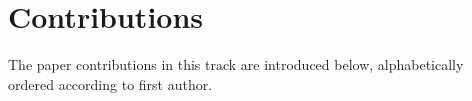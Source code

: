 

\section{Contributions}

 
The paper contributions in this track are introduced below, alphabetically ordered
according to first author.
 

 
















